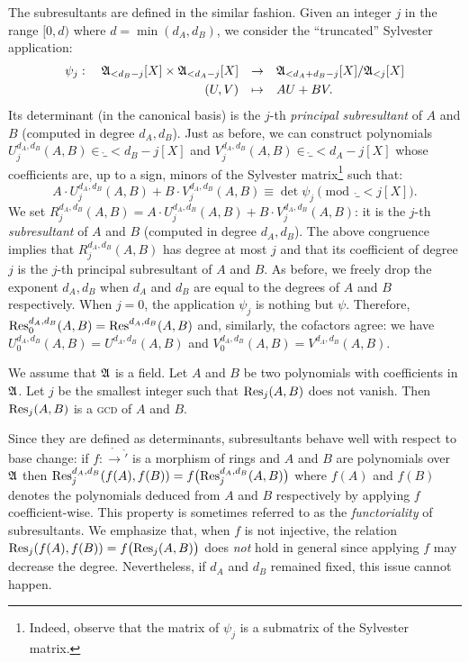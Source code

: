 \documentclass{article}
\begin{document}
\medskip

The subresultants are defined in the similar fashion. Given an
integer $j$ in the range $[0, d)$ where $d = \min(d_A, d_B)$, we
consider the ``truncated'' Sylvester application:
$$\begin{array}{rcl}
\psi_j : \quad
\ring_{< d_B-j}[X] \times \ring_{< d_A-j}[X] & \to &
\ring_{< d_A+d_B-j}[X]/\ring_{< j}[X] \smallskip \\
(U,V) & \mapsto & AU + BV.
\end{array}$$
Its determinant (in the canonical basis) is the $j$-th \emph{principal 
subresultant} of $A$ and $B$ (computed in degree $d_A, d_B$). Just 
as before, we can construct polynomials $U_j^{d_A, d_B}(A,B) \in
\ring_{< d_B-j}[X]$ and $V_j^{d_A, d_B}(A,B) \in \ring_{< d_A-j}[X]$
whose coefficients are, up to a sign, minors of the Sylvester 
matrix\footnote{Indeed, observe that the matrix of $\psi_j$ is a
submatrix of the Sylvester matrix.} such that:
$$A \cdot U_j^{d_A, d_B}(A,B) + B \cdot V_j^{d_A, d_B}(A,B) 
\equiv \det \psi_j \pmod {\ring_{< j}[X]}.$$
We set $R_j^{d_A, d_B}(A,B) = A \cdot U_j^{d_A, d_B}(A,B) + B \cdot 
V_j^{d_A, d_B}(A,B)$: it is the $j$-th \emph{subresultant} of $A$
and $B$ (computed in degree $d_A, d_B$). The above congruence implies
that $R_j^{d_A, d_B}(A,B)$ has degree at most $j$ and that its
coefficient of degree $j$ is the $j$-th principal subresultant of $A$
and $B$. As before, we freely drop the exponent $d_A, d_B$ when
$d_A$ and $d_B$ are equal to the degrees of $A$ and $B$ respectively.
When $j=0$, the application $\psi_j$ is nothing but $\psi$. Therefore,
$\text{\rm Res}_0^{d_A, d_B}(A,B) = \text{\rm Res}^{d_A, d_B}(A,B)$ and, similarly, the
cofactors agree: we have $U_0^{d_A, d_B}(A,B) = U^{d_A, d_B}(A,B)$
and $V_0^{d_A, d_B}(A,B) = V^{d_A, d_B}(A,B)$.

\begin{theo}
We assume that $\mathfrak A$ is a field. Let $A$ and $B$ be two polynomials
with coefficients in $\mathfrak A$. Let $j$ be the smallest integer such
that $\text{\rm Res}_j(A,B)$ does not vanish. Then $\text{\rm Res}_j(A,B)$ is a \textsc{gcd}
of $A$ and $B$.
\end{theo}

Since they are defined as determinants, subresultants behave well with 
respect to base change: if $f : \ring \to \ring'$ is a morphism of rings 
and $A$ and $B$ are polynomials over $\mathfrak A$ then $\text{\rm Res}_j^{d_A,d_B} 
(f(A),f(B)) = f\big(\text{\rm Res}_j^{d_A,d_B}(A,B)\big)$ where $f(A)$ and $f(B)$ 
denotes the polynomials deduced from $A$ and $B$ respectively by 
applying $f$ coefficient-wise. This property is sometimes referred to as 
the \emph{functoriality} of subresultants.
We emphasize that, when $f$ is not injective, the relation 
$\text{\rm Res}_j(f(A),f(B)) = f\big(\text{\rm Res}_j(A,B)\big)$ does \emph{not} hold in 
general since applying $f$ may decrease the degree. Nevertheless, if
$d_A$ and $d_B$ remained fixed, this issue cannot happen.
\end{document}
